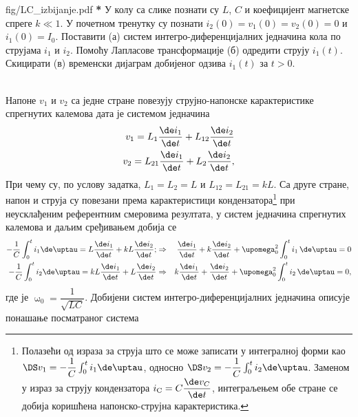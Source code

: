 \begin{slikaDesno}{fig/LC_izbijanje.pdf}
    \textbf{{\color{red}*}}\PID
    У колу са слике познати су 
    $L$, 
    $C$ и коефицијент магнетске спреге $k \ll 1$.
    У почетном тренутку су познати 
    $i_2(0) = v_1(0) = v_2(0) = 0$ и 
    $i_1(0) = I_0$. Поставити (а)
    систем 
    интегро-диференцијалних једначина кола 
    по струјама $i_1$ и $i_2$. Помоћу 
    Лапласове
    трансформације (б) одредити струју $i_1(t)$.
    Скицирати (в) временски дијаграм 
    добијеног одзива
    $i_1(t)$ за $t > 0$.
\end{slikaDesno} \\

\RESENJE 
Напоне $v_1$ и $v_2$ са једне стране повезују струјно-напонске карактеристике
спрегнутих калемова дата је системом једначина 
\begin{eqnarray}
    v_1 = L_1 \dfrac{\de i_1}{\de t} + L_{12} \dfrac{\de i_2}{\de t} \\
    v_2 = L_{21} \dfrac{\de i_1}{\de t} + L_{2} \dfrac{\de i_2}{\de t},
\end{eqnarray}
При чему су, по услову задатка, $L_1 = L_2 = L$ и $L_{12} = L_{21} = kL$. Са друге стране, 
напон и струја су повезани према карактеристици кондензатора\footnote{
Полазећи од израза за струја што се може записати у интегралној форми као 
$\DS v_{\rm 1} = - \dfrac{1}{C} \int_{0}^{t} i_1 \de \uptau$, односно
$\DS v_{\rm 2} = - \dfrac{1}{C} \int_{0}^{t} i_2 \de \uptau$.
Заменом у израз за струју кондензатора $i_{\rm C} = C \dfrac{\de v_C}{\de t}$, интеграљењем
обе стране се добија коришћена напонско-струјна карактеристика.
} при неусклађеним референтним 
смеровима резултата, у систем једначина спрегнутих калемова и даљим сређивањем добија се 
\begin{eqnarray}
    - \dfrac{1}{C} \int_{0}^{t} i_1 \de \uptau = L \dfrac{\de i_1}{\de t} + kL \dfrac{\de i_2}{\de t}; 
    & \Rightarrow & 
    \dfrac{\de i_1}{\de t} + k \dfrac{\de i_2}{\de t} + \upomega_0^2 \int_0^t i_1 \, \de \uptau = 0
    \\
    - \dfrac{1}{C} \int_{0}^{t} i_2 \de \uptau = kL \dfrac{\de i_1}{\de t} + L \dfrac{\de i_2}{\de t}
    & \Rightarrow &
    k \dfrac{\de i_1}{\de t} + \dfrac{\de i_2}{\de t} + \upomega_0^2 \int_0^t i_2 \, \de \uptau = 0,
\end{eqnarray}
где је $\upomega_0 = \dfrac{1}{\sqrt{LC}}$. Добијени систем интегро-диференцијалних једначина 
описује понашање посматраног система \\

